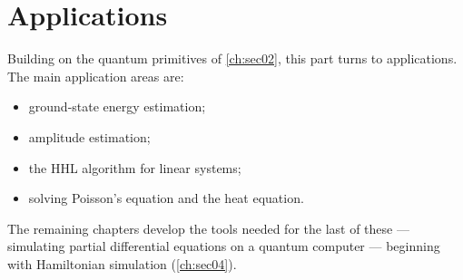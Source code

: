 \chapter{Applications}\label{ch:sec03}

Building on the quantum primitives of \cref{ch:sec02}, this part turns to
applications. The main application areas are:
\begin{itemize}
  \item ground-state energy estimation;
  \item amplitude estimation;
  \item the HHL algorithm for linear systems;
  \item solving Poisson's equation and the heat equation.
\end{itemize}
The remaining chapters develop the tools needed for the last of these ---
simulating partial differential equations on a quantum computer --- beginning
with Hamiltonian simulation (\cref{ch:sec04}).
